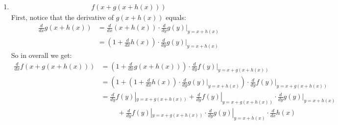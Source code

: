 \documentclass{article}
\newcommand{\DXX}[1]{ \frac{d}{ d #1 } }
\begin{document}
\begin{enumerate}
\begin{enumerate}
\end{enumerate}
\item 
    \begin{equation*}
        \begin{split}
            f\left( x + g \left( x + h(x)\right)\right)
        \end{split}
    \end{equation*}
    First, notice that the derivative of $g\left( x + h(x) \right)$ equals: 
    \begin{equation*}
        \begin{split}
            \frac{d}{dx}g\left( x + h(x) \right) & = \DXX{x} \left( x + h(x) \right) \cdot \DXX{y}g(y)|_{y= x+h(x)} \\
            & = \left( 1 + \DXX{x} h(x) \right) \cdot  \DXX{y}g(y)|_{y= x+h(x)}       
            \end{split}
    \end{equation*}
    So in overall we get: 
    \begin{equation*}
        \begin{split}
            \DXX{x} f\left(x + g\left( x + h(x)\right) \right) &= \left(1 + \DXX{x}  g\left( x + h(x) \right) \right) \cdot \DXX{y} f(y) |_{y = x + g\left( x + h(x) \right)}  \\
            &=  \left(1 + \left( 1 + \DXX{x} h(x) \right) \cdot  \DXX{y}g(y)|_{y= x+h(x)} \right) \cdot \DXX{y} f(y) |_{y = x + g\left( x + h(x) \right)}  \\
            &= \DXX{y} f(y) |_{y = x + g\left( x + h(x) \right)} + \DXX{y} f(y) |_{y = x + g\left( x + h(x) \right)}   
             \cdot \DXX{y}g(y)|_{y= x+h(x)} \\ 
             & \ \ \ \ \ \ \ \ \ \ \ +  \DXX{y} f(y) |_{y = x + g\left( x + h(x) \right)}   
             \cdot \DXX{y}g(y)|_{y= x+h(x)} \cdot \DXX{x} h(x) 
        \end{split}
    \end{equation*}
\end{enumerate}
\end{document}

